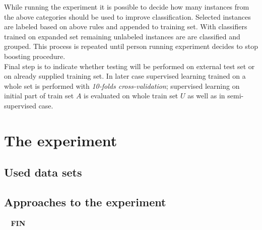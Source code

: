 \documentclass[12pt, a4paper, pdflatex]{report}
\begin{document}
While running the experiment it is possible to decide how many instances from the above categories should be used to improve classification. Selected instances are labeled based on above rules and appended to training set. With classifiers trained on expanded set remaining unlabeled instances are are classified and grouped. This process is repeated until person running experiment decides to stop boosting procedure.\\

Final step is to indicate whether testing will be performed on external test set or on already supplied training set. In later case supervised learning trained on a whole set is performed with \emph{10-folds cross-validation}; supervised learning on initial part of train set $A$ is evaluated on whole train set $U$ as well as in semi-supervised case.

\section{The experiment}
\subsection{Used data sets}
\subsection{Approaches to the experiment}



\newpage
\begin{center} \textbf{\huge ~\vspace{5cm} FIN} \end{center}

{}

\end{document}
